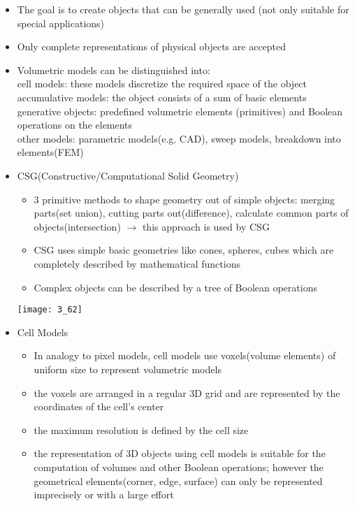 \documentclass{standalone}
\begin{document}
\begin{itemize}
	\item The goal is to create objects that can be generally used (not only suitable for special applications)
	\item Only complete representations of physical objects are accepted
	\item Volumetric models can be distinguished into: \\
	cell models: these models discretize the required space of the object \\
	accumulative models: the object consists of a sum of basic elements \\
	generative objects: predefined volumetric elements (primitives) and Boolean operations on the elements \\
	other models: parametric models(e.g. CAD), sweep models, breakdown into elements(FEM)
	\item CSG(Constructive/Computational Solid Geometry)
	\begin{itemize}
		\item 3 primitive methods to shape geometry out of simple objects: merging parts(set union), cutting parts out(difference), calculate common parts of objects(intersection) $\rightarrow$ this approach is used by CSG
		\item CSG uses simple basic geometries like cones, spheres, cubes which are completely described by mathematical functions
		\item Complex objects can be described by a tree of Boolean operations		
	\end{itemize}
	\texttt{[image: 3\_62]}
	\item Cell Models
	\begin{itemize}
		\item In analogy to pixel models, cell models use voxels(volume elements) of uniform size to represent volumetric models
		\item the voxels are arranged in a regular 3D grid and are represented by the coordinates of the cell's center
		\item the maximum resolution is defined by the cell size
		\item the representation of 3D objects using cell models is suitable for the computation of volumes and other Boolean operations; however the geometrical elements(corner, edge, surface) can only be represented imprecisely or with a large effort
	\end{itemize}
\end{itemize}
\end{document}
